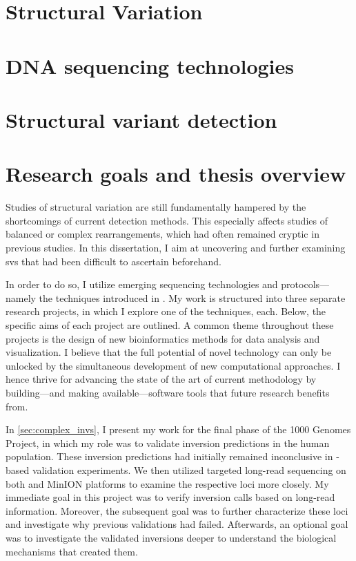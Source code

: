 \section{Structural Variation}
\label{sec:sv}



\section{DNA sequencing technologies}
\label{sec:sequencing}



\section{Structural variant detection}
\label{sec:sv_detection}



\section{Research goals and thesis overview}
\label{sec:motivation}

Studies of structural variation are still fundamentally hampered by the
shortcomings of current \sv detection methods. This especially affects studies
of balanced or complex rearrangements, which had often remained cryptic in
previous studies. In this dissertation, I aim at uncovering and further examining
\acp{sv} that had been difficult to ascertain beforehand.

In order to do so, I
utilize emerging sequencing technologies and protocols---namely the
techniques introduced in .
My work is structured into three separate research projects, in which I explore
one of the techniques, each. Below, the specific aims of each project are
outlined. A common theme throughout these projects is the design of new
bioinformatics methods for data analysis and visualization. I believe that the
full potential of novel technology can only be unlocked by the simultaneous
development of new computational approaches. I hence thrive for advancing the
state of the art of current methodology by building---and making
available---software tools that future research benefits from.

In \cref{sec:complex_invs}, I present my work for the final phase of the
1000 Genomes Project, in which my role was to validate inversion predictions in
the human population. These inversion predictions had initially remained
inconclusive in \pcr-based validation experiments. We then utilized targeted
long-read sequencing on both \pacbio and \ont MinION platforms to examine the
respective loci more closely. My immediate goal in this project was to verify
inversion calls based on long-read information. Moreover, the subsequent goal
was to further characterize these loci and investigate why previous validations
had failed. Afterwards, an optional goal was to investigate the validated
inversions deeper to understand the biological mechanisms that created
them.

